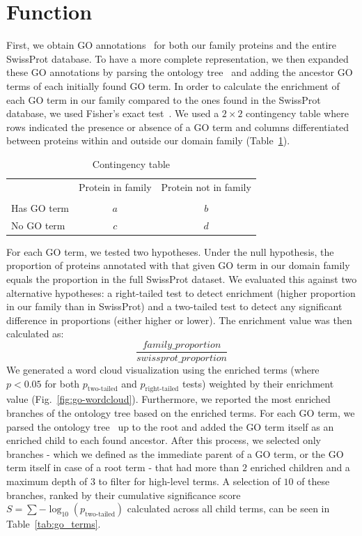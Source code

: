\section{Function}

First, we obtain GO annotations~\cite{gene_ontology} for both our family proteins and the entire SwissProt database. To have a more complete representation, we then expanded these GO annotations by parsing the ontology tree~\cite{obo_parser} and adding the ancestor GO terms of each initially found GO term. In order to calculate the enrichment of each GO term in our family compared to the ones found in the SwissProt database, we used Fisher's exact test~\cite{fisher_test}. We used a $2 \times 2$ contingency table where rows indicated the presence or absence of a GO term and columns differentiated between proteins within and outside our domain family (Table~\ref{tab:contingency}). 
\begin{table}[h!]
    \centering
    \small
    \begin{tabular}{lccc}
        \toprule
         & Protein in family & \multicolumn{2}{c}{Protein not in family} \\
        \\
        \midrule
        Has GO term & $a$ & \multicolumn{2}{c}{$b$} \\
        No GO term & $c$ & \multicolumn{2}{c}{$d$} \\
        \bottomrule
    \end{tabular}
    \caption{Contingency table}
    \label{tab:contingency}
\end{table}
For each GO term, we tested two hypotheses. Under the null hypothesis, the proportion of proteins annotated with that given GO term in our domain family equals the proportion in the full SwissProt dataset. We evaluated this against two alternative hypotheses: a right-tailed test to detect enrichment (higher proportion in our family than in SwissProt) and a two-tailed test to detect any significant difference in proportions (either higher or lower). The enrichment value was then calculated as:
$$
\dfrac{family\_proportion}{swissprot\_proportion}
$$
We generated a word cloud visualization using the enriched terms (where $p < 0.05$ for both $p_{\text{two-tailed}}$ and $p_{\text{right-tailed}}$ tests) weighted by their enrichment value (Fig.~\ref{fig:go-wordcloud}). Furthermore, we reported the most enriched branches of the ontology tree based on the enriched terms. For each GO term, we parsed the ontology tree~\cite{obo_parser} up to the root and added the GO term itself as an enriched child to each found ancestor. After this process, we selected only branches - which we defined as the immediate parent of a GO term, or the GO term itself in case of a root term - that had more than $2$ enriched children and a maximum depth of $3$ to filter for high-level terms. A selection of $10$ of these branches, ranked by their cumulative significance score $S = \sum -\log_{10}(p_{\text{two-tailed}})$ calculated across all child terms, can be seen in Table~\ref{tab:go_terms}.


